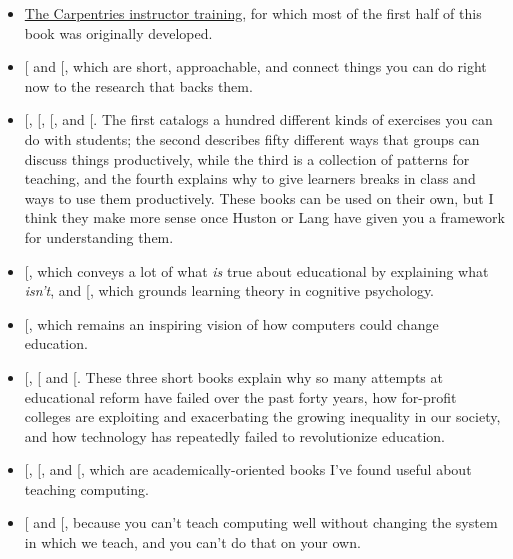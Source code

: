 \begin{itemize}
\item
  \href{http://carpentries.github.io/instructor-training/}{The Carpentries instructor training}, for
  which most of the first half of this book was originally developed.
\item
  {[}\protect[\hyperlink{b:Lang2016}{Lang2016}]{]} and {[}\protect[\hyperlink{b:Hust2012}{Hust2012}]{]}, which are short,
  approachable, and connect things you can do right now to the
  research that backs them.
\item
  {[}\protect[\hyperlink{b:Majo2015}{Majo2015}]{]}, {[}\protect[\hyperlink{b:Broo2016}{Broo2016}]{]}, {[}\protect[\hyperlink{b:Berg2012}{Berg2012}]{]}, and
  {[}\protect[\hyperlink{b:Rice2018}{Rice2018}]{]}. The first catalogs a hundred different kinds of
  exercises you can do with students; the second describes fifty
  different ways that groups can discuss things productively, while
  the third is a collection of patterns for teaching, and the fourth
  explains why to give learners breaks in class and ways to use them
  productively. These books can be used on their own, but I think they
  make more sense once Huston or Lang have given you a framework for
  understanding them.
\item
  {[}\protect[\hyperlink{b:DeBr2015}{DeBr2015}]{]}, which conveys a lot of what \emph{is} true about
  educational by explaining what \emph{isn't}, and {[}\protect[\hyperlink{b:Dida2016}{Dida2016}]{]},
  which grounds learning theory in cognitive psychology.
\item
  {[}\protect[\hyperlink{b:Pape1993}{Pape1993}]{]}, which remains an inspiring vision of how
  computers could change education.
\item
  {[}\protect[\hyperlink{b:Gree2014}{Gree2014}]{]}, {[}\protect[\hyperlink{b:McMi2017}{McMi2017}]{]} and {[}\protect[\hyperlink{b:Watt2014}{Watt2014}]{]}. These
  three short books explain why so many attempts at educational reform
  have failed over the past forty years, how for-profit colleges are
  exploiting and exacerbating the growing inequality in our society,
  and how technology has repeatedly failed to revolutionize education.
\item
  {[}\protect[\hyperlink{b:Guzd2015a}{Guzd2015a}]{]}, {[}\protect[\hyperlink{b:Hazz2014}{Hazz2014}]{]}, and {[}\protect[\hyperlink{b:Sent2018}{Sent2018}]{]},
  which are academically-oriented books I've found useful about
  teaching computing.
\item
  {[}\protect[\hyperlink{b:Brow2007}{Brow2007}]{]} and {[}\protect[\hyperlink{b:Mann2015}{Mann2015}]{]}, because you can't teach
  computing well without changing the system in which we teach, and
  you can't do that on your own.
\end{itemize}

